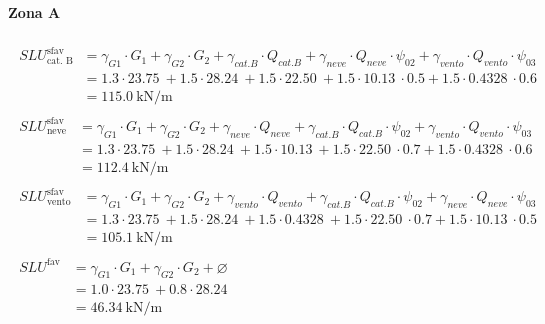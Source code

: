 \paragraph*{Zona A}
\allowdisplaybreaks %
\begin{align} 
	\begin{split}
	SLU^{\text{sfav}}_{\text{cat. B}} &= \gamma_{G1}\cdot G_1 + \gamma_{G2} \cdot G_2 + \gamma_{cat. B} \cdot Q_{cat. B} + \gamma_{neve}\cdot Q_{neve}\cdot\psi_{02} + \gamma_{vento}\cdot Q_{vento} \cdot \psi_{03}  \\
	&= 1.3\cdot\SI{23.75}{} + 1.5\cdot\SI{28.24}{} + 1.5\cdot\SI{22.50}{} + 1.5\cdot\SI{10.13}{}\cdot0.5 + 1.5\cdot\SI{0.4328}{}\cdot0.6\\
	&= \SI{115.0}{\kilo\newton\per\meter}
	\end{split} \\ 
	\begin{split}
	SLU^{\text{sfav}}_{\text{neve}} &= \gamma_{G1}\cdot G_1 + \gamma_{G2} \cdot G_2 + \gamma_{neve}\cdot Q_{neve} + \gamma_{cat. B} \cdot Q_{cat. B}\cdot\psi_{02} + \gamma_{vento}\cdot Q_{vento} \cdot \psi_{03}  \\
	&= 1.3\cdot\SI{23.75}{} + 1.5\cdot\SI{28.24}{} + 1.5\cdot\SI{10.13}{} + 1.5\cdot\SI{22.50}{}\cdot0.7 + 1.5\cdot\SI{0.4328}{}\cdot0.6\\
	&= \SI{112.4}{\kilo\newton\per\meter}
	\end{split} \\ 
	\begin{split}
	SLU^{\text{sfav}}_{\text{vento}} &= \gamma_{G1}\cdot G_1 + \gamma_{G2} \cdot G_2 + \gamma_{vento}\cdot Q_{vento} + \gamma_{cat. B} \cdot Q_{cat. B}\cdot\psi_{02} + \gamma_{neve}\cdot Q_{neve} \cdot \psi_{03}  \\
	&= 1.3\cdot\SI{23.75}{} + 1.5\cdot\SI{28.24}{} + 1.5\cdot\SI{0.4328}{} + 1.5\cdot\SI{22.50}{}\cdot0.7 + 1.5\cdot\SI{10.13}{}\cdot0.5\\
	&= \SI{105.1}{\kilo\newton\per\meter}
	\end{split} \\ 
	\begin{split}
	SLU^{\text{fav}} &= \gamma_{G1}\cdot G_1 + \gamma_{G2} \cdot G_2 + \varnothing\\
	&= 1.0\cdot\SI{23.75}{} + 0.8\cdot\SI{28.24}{}\\
	&= \SI{46.34}{\kilo\newton\per\meter}	
	\end{split} \\ 

\end{align}
